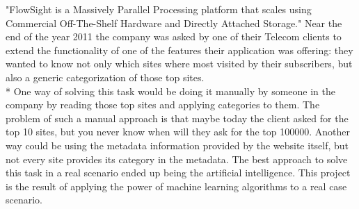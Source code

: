 
 "FlowSight is a Massively Parallel Processing platform that scales using Commercial Off-The-Shelf Hardware and Directly Attached Storage."
Near the end of the year 2011 the company was asked by one of their Telecom clients to extend the functionality of one of the features their application was offering: they wanted to know not only which sites
where most visited by their subscribers, but also a generic categorization of those top sites. \\*
One way of solving this task would be doing it manually by someone in the company by reading those top sites and applying categories to them.
The problem of such a manual approach is that maybe today the client asked for the top 10 sites, but you never know when will they ask for the top 100000. 
Another way could be using the metadata information provided by the website itself, but not every site provides its category in the metadata.
The best approach to solve this task in a real scenario ended up being the artificial intelligence.
This project is the result of applying the power of machine learning algorithms to a real case scenario.


